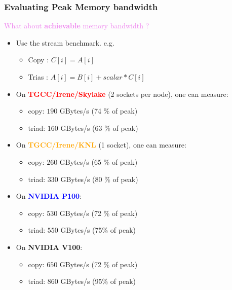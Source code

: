\begin{frame}
  \frametitle{Evaluating Peak Memory bandwidth}

  \textcolor{violet}{\Large What about {\bf achievable} memory bandwidth ?}

  \begin{itemize}
  \item Use the stream benchmark. e.g. 
    \begin{itemize}
    \item Copy : $C[i] = A[i]$
    \item Trias : $A[i] = B[i] + scalar * C[i]$
    \end{itemize}
  \item On \textcolor{red}{\bf TGCC/Irene/Skylake} (2 sockets per node), one can measure:
    \begin{itemize}
    \item copy: $190$ GBytes/s (74 \% of peak)
    \item triad: $160$ GBytes/s (63 \% of peak)
    \end{itemize}
  \item On \textcolor{orange}{\bf TGCC/Irene/KNL} (1 socket), one can measure:
    \begin{itemize}
    \item copy: $260$ GBytes/s (65 \% of peak)
    \item triad: $330$ GBytes/s (80 \% of peak)
    \end{itemize}
  \item On \textcolor{blue}{\bf NVIDIA P100}:
    \begin{itemize}
    \item copy: $530$ GBytes/s (72 \% of peak)
    \item triad: $550$ GBytes/s (75\% of peak)
    \end{itemize}
  \item On \textcolor{RoyalPurple}{\bf NVIDIA V100}:
    \begin{itemize}
    \item copy: $650$ GBytes/s (72 \% of peak)
    \item triad: $860$ GBytes/s (95\% of peak)
    \end{itemize}
  \end{itemize}

\end{frame}
